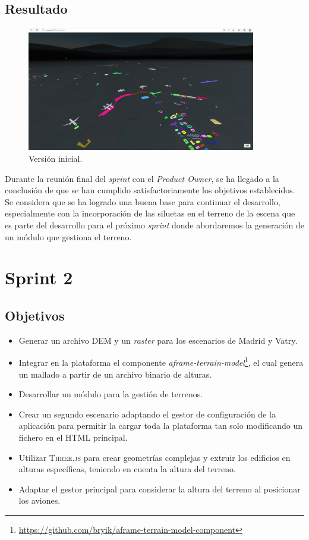 \documentclass[a4paper, 11pt]{book}
\begin{document}
\subsection{Resultado}
\begin{figure}[h]
  \centering
  \includegraphics[width=10cm, keepaspectratio]{img/Sprint1.png}
  \caption{Versión inicial.}
  \label{fig:sprint1}
\end{figure}
Durante la reunión final del \emph{sprint} con el \emph{Product Owner}, se ha llegado a la conclusión de que se han cumplido satisfactoriamente los objetivos establecidos. Se considera que se ha logrado una buena base para continuar el desarrollo, especialmente con la incorporación de las siluetas en el terreno de la escena que es parte del desarrollo para el próximo \emph{sprint} donde abordaremos la generación de un módulo que gestiona el terreno.
\section{Sprint 2}
\subsection{Objetivos}
\begin{itemize}
    \item Generar un archivo \textsc{DEM} y un \emph{raster} para los escenarios de Madrid y Vatry.
    \item Integrar en la plataforma el componente \emph{aframe-terrain-model}\footnote{\url{https://github.com/bryik/aframe-terrain-model-component}}, el cual genera un mallado a partir de un archivo binario de alturas.
    \item Desarrollar un módulo para la gestión de terrenos.
    \item Crear un segundo escenario adaptando el gestor de configuración de la aplicación para permitir la cargar toda la plataforma tan solo modificando un fichero en el \textsc{HTML} principal.
    \item Utilizar \textsc{Three.js} para crear geometrías complejas y extruir los edificios en alturas específicas, teniendo en cuenta la altura del terreno.
    \item Adaptar el gestor principal para considerar la altura del terreno al posicionar los aviones.
\end{itemize}
\end{document}
